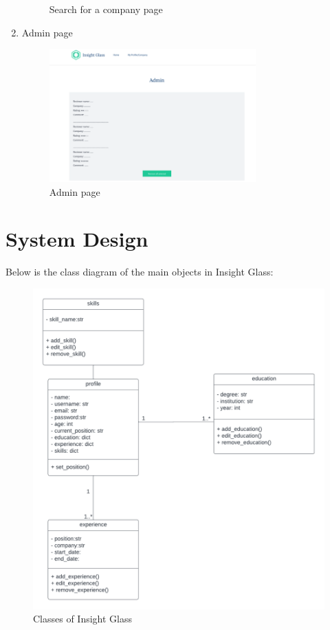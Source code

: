 \documentclass[titlepage]{article}
\begin{document}
\begin{enumerate}
\begin{figure}[H]
        \caption{Search for a company page}
    \end{figure}
    \item Admin page
    \begin{figure}[H]
        \centering
        \includegraphics[width=0.75\textwidth]{Images/Admin_page.png}
        \caption{Admin page}
    \end{figure}
\end{enumerate}
\newpage
\section{System Design}
Below is the class diagram of the main objects in Insight Glass:
\begin{figure}[H]
    \centering
    \includegraphics[width=1\textwidth]{Images/class_I.png}
    \caption{Classes of Insight Glass}
\end{figure}
\end{document}
